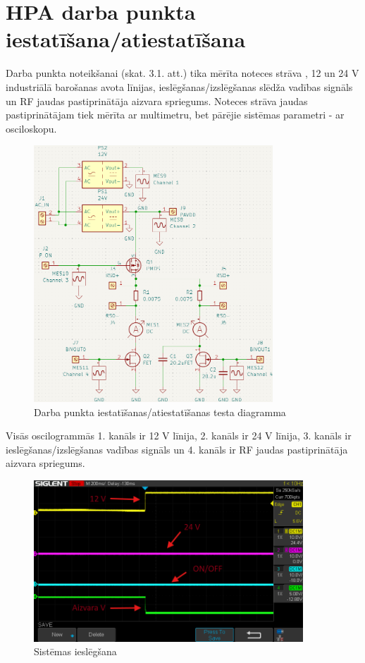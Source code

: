 \section{HPA darba punkta iestatīšana/atiestatīšana}
Darba punkta noteikšanai (skat. 3.1. att.) tika mērīta noteces strāva , 12  un 24 V industriālā barošanas avota līnijas, ieslēgšanas/izslēgšanas slēdža vadības signāls un RF jaudas pastiprinātāja aizvara spriegums. Noteces strāva jaudas pastiprinātājam tiek mērīta ar multimetru, bet pārējie sistēmas parametri - ar osciloskopu.
\begin{figure}[H]
	\centering
    \includegraphics[width=0.8\textwidth]{pictures/test_diagram.png}\hspace{1cm}
    \caption{Darba punkta iestatīšanas/atiestatīšanas testa diagramma}
\end{figure}
Visās oscilogrammās 1. kanāls ir 12 V līnija, 2. kanāls ir 24 V līnija, 3. kanāls ir ieslēgšanas/izslēgšanas vadības signāls un 4. kanāls ir RF jaudas pastiprinātāja aizvara spriegums.
\begin{figure}[H]
	\centering
    \includegraphics[width=0.9\textwidth]{pictures/device_startup.png}\hspace{1cm}
    \caption{Sistēmas ieslēgšana}
\end{figure}
